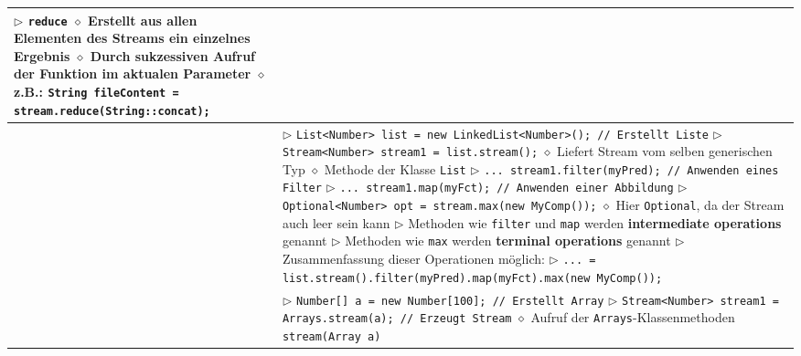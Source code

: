 \begin{tabular}{ | p{4cm} p{13.5cm} | }
{	$\rhd$ \texttt{reduce} \\
	\hspace{0.4cm} $\diamond$ Erstellt aus allen Elementen des Streams ein einzelnes Ergebnis \\
	\hspace{0.4cm} $\diamond$ Durch sukzessiven Aufruf der Funktion im aktualen Parameter \\
	\hspace{0.4cm} $\diamond$ z.B.: \texttt{String fileContent = stream.reduce(String::concat);} } \\ \hline

	\makecell[l]{Stream aus Liste} & \makecell[l]{
	$\rhd$ \texttt{List<Number> list = new LinkedList<Number>(); // Erstellt Liste}	\\
	$\rhd$ \texttt{Stream<Number> stream1 = list.stream();} \\
	\hspace{0.4cm} $\diamond$ Liefert Stream vom selben generischen Typ \\
	\hspace{0.4cm} $\diamond$ Methode der Klasse \texttt{List} \\
	$\rhd$ \texttt{... stream1.filter(myPred); // Anwenden eines Filter} \\
	$\rhd$ \texttt{... stream1.map(myFct); // Anwenden einer Abbildung} \\
	$\rhd$ \texttt{Optional<Number> opt = stream.max(new MyComp());} \\
	\hspace{0.4cm} $\diamond$ Hier \texttt{Optional}, da der Stream auch leer sein kann \\
	$\rhd$ Methoden wie \texttt{filter} und \texttt{map} werden \textbf{intermediate operations} genannt \\
	$\rhd$ Methoden wie \texttt{max} werden \textbf{terminal operations} genannt \\
	$\rhd$ Zusammenfassung dieser Operationen möglich: \\
	$\rhd$ \texttt{... =  list.stream().filter(myPred).map(myFct).max(new MyComp());} } \\ \hline

	\makecell[l]{Stream aus Array} & \makecell[l]{$\rhd$ \texttt{Number[] a = new Number[100]; // Erstellt Array} \\
	$\rhd$ \texttt{Stream<Number> stream1 = Arrays.stream(a); // Erzeugt Stream} \\
	\hspace{0.4cm} $\diamond$ Aufruf der \texttt{Arrays}-Klassenmethoden \texttt{stream(Array a)} } \\ \hline


\end{tabular}
